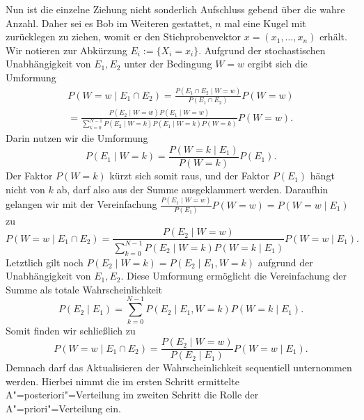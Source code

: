 Nun ist die einzelne Ziehung nicht sonderlich Aufschluss gebend über die
wahre Anzahl. Daher sei es Bob im Weiteren gestattet, $n$ mal eine
Kugel mit zurücklegen zu ziehen, womit er den Stichprobenvektor
$x=(x_1,\ldots,x_n)$ erhält. Wir notieren zur Abkürzung
$E_i:=\{X_i=x_i\}$. Aufgrund der stochastischen Unabhängigkeit von
$E_1,E_2$ unter der Bedingung $W=w$ ergibt sich die Umformung
\begin{gather*}
P(W=w\mid E_1\cap E_2) = \frac{P(E_1\cap E_2\mid W=w)}{P(E_1\cap E_2)}P(W=w)\\
= \frac{P(E_2\mid W=w)P(E_1\mid W=w)}{\sum_{k=0}^{N-1} P(E_2\mid W=k)P(E_1\mid W=k)P(W=k)}P(W=w).
\end{gather*}
Darin nutzen wir die Umformung
\[P(E_1\mid W=k) = \frac{P(W=k\mid E_1)}{P(W=k)}P(E_1).\]
Der Faktor $P(W=k)$ kürzt sich somit raus, und der Faktor $P(E_1)$
hängt nicht von $k$ ab, darf also aus der Summe ausgeklammert werden.
Daraufhin gelangen wir mit der Vereinfachung $\frac{P(E_1\mid W=w)}{P(E_1)}P(W=w)
= P(W=w\mid E_1)$ zu
\[P(W=w\mid E_1\cap E_2)
= \frac{P(E_2\mid W=w)}{\sum_{k=0}^{N-1} P(E_2\mid W=k)P(W=k\mid E_1)}P(W=w\mid E_1).\]
Letztlich gilt noch $P(E_2\mid W=k)=P(E_2\mid E_1,W=k)$ aufgrund der
Unabhängigkeit von $E_1,E_2$. Diese Umformung ermöglicht die Vereinfachung
der Summe als totale Wahrscheinlichkeit
\[P(E_2\mid E_1) = \sum_{k=0}^{N-1}P(E_2\mid E_1,W=k)P(W=k\mid E_1).\]
Somit finden wir schließlich zu
\[P(W=w\mid E_1\cap E_2)
= \frac{P(E_2\mid W=w)}{P(E_2\mid E_1)}P(W=w\mid E_1).\]
Demnach darf das Aktualisieren der Wahrscheinlichkeit sequentiell
unternommen werden. Hierbei nimmt die im ersten Schritt ermittelte
A"=posteriori"=Verteilung im zweiten Schritt die Rolle der
A"=priori"=Verteilung ein.
